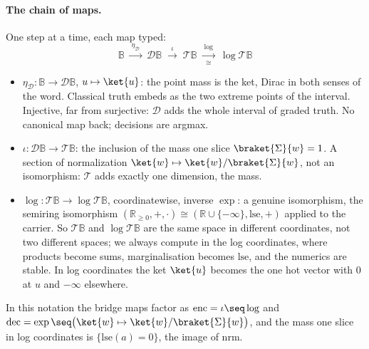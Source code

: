 \documentclass[anon]{../../journal-templates/NeSy26/nesy2026} %
\begin{document}
\paragraph{The chain of maps.} One step at a time, each map typed:
\[
  \mathbb B
  \;\xrightarrow{\ \eta_{\mathcal D}\ }\;
  \mathcal D\mathbb B
  \;\xrightarrow{\ \iota\ }\;
  \mathcal T\mathbb B
  \;\xrightarrow[\cong]{\ \log\ }\;
  \log\mathcal T\mathbb B
\]
\begin{itemize}
\item $\eta_{\mathcal D} \colon \mathbb B \to \mathcal D\mathbb B$,
  $u \mapsto \ket{u}$: the point mass is the ket, Dirac in both senses
  of the word. Classical truth embeds as the two extreme points of the
  interval. Injective, far from surjective: $\mathcal D$ adds the whole
  interval of graded truth. No canonical map back; decisions are argmax.
\item $\iota \colon \mathcal D\mathbb B \to \mathcal T\mathbb B$: the
  inclusion of the mass one slice $\braket{\Sigma}{w} = 1$. A
  section of normalization
  $\ket{w} \mapsto \ket{w} / \braket{\Sigma}{w}$, not an
  isomorphism: $\mathcal T$ adds exactly one dimension, the mass.
\item $\log \colon \mathcal T\mathbb B \to \log\mathcal T\mathbb B$,
  coordinatewise, inverse $\exp$: a genuine isomorphism, the semiring
  isomorphism $(\mathbb R_{\ge 0}, +, \cdot) \cong
  (\mathbb R \cup \{-\infty\}, \mathrm{lse}, +)$ applied to the carrier.
  So $\mathcal T\mathbb B$ and $\log\mathcal T\mathbb B$ are the same
  space in different coordinates, not two different spaces; we always
  compute in the log coordinates, where products become sums,
  marginalisation becomes $\mathrm{lse}$, and the numerics are stable. In
  log coordinates the ket $\ket{u}$ becomes the one hot vector with
  $0$ at $u$ and $-\infty$ elsewhere.
\end{itemize}
In this notation the bridge maps factor as
$\mathrm{enc} = \iota \seq \log$ and
$\mathrm{dec} = \exp \seq \bigl(\ket{w} \mapsto \ket{w} / \braket{\Sigma}{w}\bigr)$, and the mass one slice in log coordinates is
$\{\mathrm{lse}(a) = 0\}$, the image of $\mathrm{nrm}$.
\end{document}
